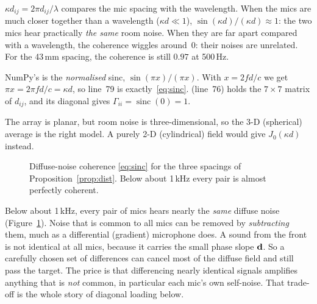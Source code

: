 \documentclass[11pt]{article}
\begin{document}
\begin{inplainwords}
$\kappa d_{ij}=2\pi d_{ij}/\lambda$ compares the mic spacing with the wavelength. When the mics are
much closer together than a wavelength ($\kappa d\ll1$), $\sin(\kappa d)/(\kappa d)\approx1$:
the two mics hear practically \emph{the same} room noise. When they are far apart compared with
a wavelength, the coherence wiggles around~0: their noises are unrelated. For the 43\,mm
spacing, the coherence is still $0.97$ at 500\,Hz.
\end{inplainwords}

NumPy's  is the \emph{normalised} sinc, $\sin(\pi x)/(\pi x)$. With
$x=2fd/c$ we get $\pi x=2\pi f d/c=\kappa d$, so line~79 is exactly~\eqref{eq:sinc}.
 (line~76) holds the $7\times7$ matrix of $d_{ij}$, and its diagonal gives
$\Gamma_{ii}=\operatorname{sinc}(0)=1$.

\begin{remark}
The array is planar, but room noise is three-dimensional, so the 3-D (spherical) average is the
right model. A purely 2-D (cylindrical) field would give $J_0(\kappa d)$ instead.
\end{remark}

\begin{figure}[ht]
\centering
{}
\caption{Diffuse-noise coherence \eqref{eq:sinc} for the three spacings of
Proposition~\ref{prop:dist}. Below about 1\,kHz every pair is almost perfectly coherent.}
\label{fig:coherence}
\end{figure}

\begin{intuition}
Below about 1\,kHz, every pair of mics hears nearly the \emph{same} diffuse noise
(Figure~\ref{fig:coherence}). Noise that is common to all mics can be removed by
\emph{subtracting} them, much as a differential (gradient) microphone does. A sound from the
front is not identical at all mics, because it carries the small phase slope $\mathbf{d}$. So a
carefully chosen set of differences can cancel most of the diffuse field and still pass the
target. The price is that differencing nearly identical signals amplifies anything that is
\emph{not} common, in particular each mic's own self-noise. That trade-off is the whole story of
diagonal loading below.
\end{intuition}
\end{document}
